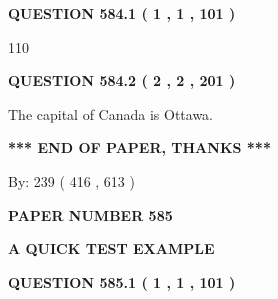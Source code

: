\documentclass[12pt]{article}
\begin{document}
{\textbf{\Large{QUESTION
584.1 
 ( 1 , 1 , 101 )
}}}
  
  
 
 
\noindent{}

110
 
 
  
\vspace{0.2in}
  
{\textbf{\Large{QUESTION
584.2 
 ( 2 , 2 , 201 )
}}}
  
  
 
 
\noindent{}
 
 
The capital of Canada is Ottawa.
 
 
 
 
   
   
 \vspace{0.2in}
 
   
   
   
   
\vspace{1.0in} 
{\textbf{\large{ *** END OF PAPER, THANKS *** }}} 
   
   
\hspace{1.0in} By: 
 239 ( 416 ,  613 )
   
   
   
   
\newpage 
\setcounter{page}{ 
   585001 } 
   
   
   
   
 {\textbf{ \Large{ PAPER NUMBER  585  }}}
   
   
\vspace{0.2in}
   
   
   
   
   
   
 \vspace{0.2in}
{\LARGE {\textbf{ A QUICK TEST EXAMPLE}}}
   
   
  
\vspace{0.2in}
  
{\textbf{\Large{QUESTION
585.1 
 ( 1 , 1 , 101 )
}}}
  
  
 
 
\noindent{}
\end{document}
